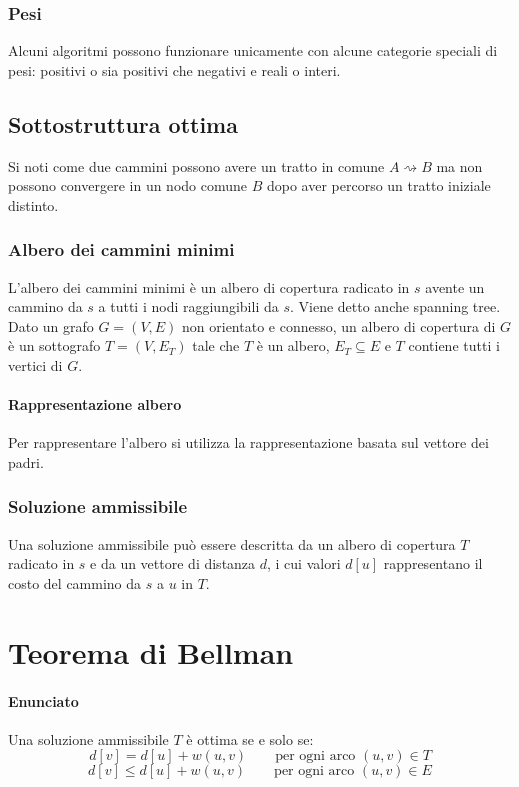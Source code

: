 \subsubsection{Pesi}
Alcuni algoritmi possono funzionare unicamente con alcune categorie speciali di pesi: positivi o sia positivi che negativi e reali o interi.
\subsection{Sottostruttura ottima}
Si noti come due cammini possono avere un tratto in comune $A\rightsquigarrow B$ ma non possono convergere in un nodo comune $B$ dopo aver percorso un tratto iniziale distinto. 
\subsubsection{Albero dei cammini minimi}
L'albero dei cammini minimi \`e un albero di copertura radicato in $s$ avente un cammino da $s$ a tutti i nodi raggiungibili da $s$. Viene detto anche spanning tree. Dato un grafo $G=
(V, E)$ non orientato e connesso, un albero di copertura di $G$ \`e un sottografo $T=(V, E_T)$ tale che $T$ \`e un albero, $E_T\subseteq E$ e $T$ contiene tutti i vertici di $G$. 
\paragraph{Rappresentazione albero}
Per rappresentare l'albero si utilizza la rappresentazione basata sul vettore dei padri.
\subsubsection{Soluzione ammissibile}
Una soluzione ammissibile pu\`o essere descritta da un albero di copertura $T$ radicato in $s$ e da un vettore di distanza $d$, i cui valori $d[u]$ rappresentano il costo del cammino da
$s$ a $u$ in $T$.\\

\section{Teorema di Bellman}
\paragraph{Enunciato}
Una soluzione ammissibile $T$ \`e ottima se e solo se: $$d[v] = d[u]+w(u, v) \quad\quad \text{per ogni arco }(u, v)\in T$$ $$d[v] \le d[u]+w(u, v) \quad\quad \text{per ogni arco }(u, v)
\in E$$
